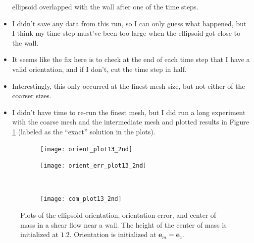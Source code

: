 \documentclass{article}
\newcommand{\vect}[1]{\boldsymbol{\mathbf{#1}}}
\begin{document}
\begin{itemize}
  ellipsoid overlapped with the wall after one of the time steps.
\item I didn't save any data from this run, so I can only guess what
  happened, but I think my time step must've been too large when the
  ellipsoid got close to the wall.
\item It seems like the fix here is to check at the end of each time
  step that I have a valid orientation, and if I don't, cut the time
  step in half.
\item Interestingly, this only occurred at the finest mesh size, but
  not either of the coarser sizes.
\item I didn't have time to re-run the finest mesh, but I did run a
  long experiment with the coarse mesh and the intermediate mesh and
  plotted results in Figure \ref{fig:long-wall-test} (labeled as the
  ``exact'' solution in the plots).
\end{itemize}

\begin{figure}
  \centering
  \begin{subfigure}{0.49\textwidth}
    \texttt{[image: orient\_plot13\_2nd]}
  \end{subfigure}
  \hfill
  \begin{subfigure}{0.49\textwidth}
    \texttt{[image: orient\_err\_plot13\_2nd]}
  \end{subfigure}
  \\
  \begin{subfigure}{0.49\textwidth}
    \texttt{[image: com\_plot13\_2nd]}
  \end{subfigure}
  \caption{Plots of the ellipsoid orientation, orientation error, and
     center of mass in a shear flow near a wall. The height of the
     center of mass is initialized at $1.2$. Orientation is initialized
     at $\vect{e}_m = \vect{e}_x$. }
  \label{fig:long-wall-test}
\end{figure}
\end{document}
